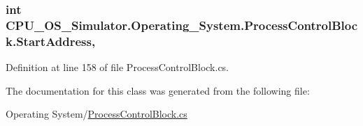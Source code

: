 \subsubsection[{Start\+Address}]{\setlength{\rightskip}{0pt plus 5cm}int C\+P\+U\+\_\+\+O\+S\+\_\+\+Simulator.\+Operating\+\_\+\+System.\+Process\+Control\+Block.\+Start\+Address\hspace{0.3cm}{\ttfamily [get]}, {\ttfamily [set]}}\label{class_c_p_u___o_s___simulator_1_1_operating___system_1_1_process_control_block_a0db4bf8588b286ebe82f80e3e00e2132}


Definition at line 158 of file Process\+Control\+Block.\+cs.



The documentation for this class was generated from the following file\+:\begin{DoxyCompactItemize}
\item 
Operating System/\hyperlink{_process_control_block_8cs}{Process\+Control\+Block.\+cs}\end{DoxyCompactItemize}
